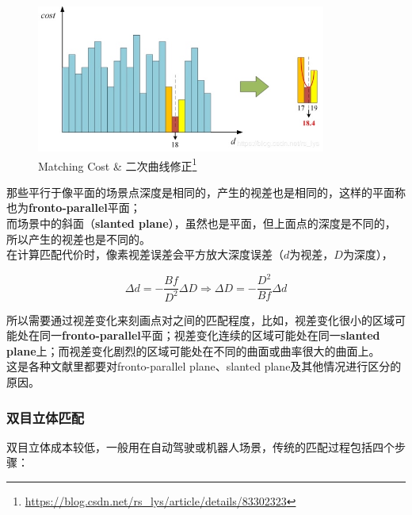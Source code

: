 			\begin{figure}[H]
				\begin{center}
					\includegraphics[width=0.85\textwidth]{images/matching_cost.jpeg}
				\end{center}
				\caption{Matching Cost \& 二次曲线修正\protect\footnote{\url{https://blog.csdn.net/rs_lys/article/details/83302323}}}
			\end{figure}

			那些平行于像平面的场景点深度是相同的，产生的视差也是相同的，这样的平面称也为\textbf{fronto-parallel}平面；\\

			而场景中的斜面（\textbf{slanted plane}），虽然也是平面，但上面点的深度是不同的，所以产生的视差也是不同的。\\

			在计算匹配代价时，像素视差误差会平方放大深度误差（$d$为视差，$D$为深度），

			$$
				\Delta d= -\frac{Bf}{D^2}\Delta D \Rightarrow \Delta D = -\frac{D^2}{Bf}\Delta d
			$$
			
			所以需要通过视差变化来刻画点对之间的匹配程度，比如，视差变化很小的区域可能处在同一\textbf{fronto-parallel}平面；视差变化连续的区域可能处在同一\textbf{slanted plane}上；而视差变化剧烈的区域可能处在不同的曲面或曲率很大的曲面上。\\

			这是各种文献里都要对fronto-parallel plane、slanted plane及其他情况进行区分的原因。

		\subsubsection*{双目立体匹配}
			双目立体成本较低，一般用在自动驾驶或机器人场景，传统的匹配过程包括四个步骤：

